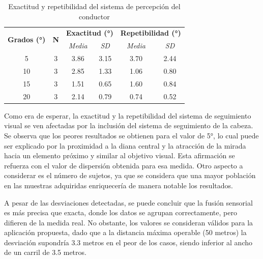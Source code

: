\newpage
\begin{table}[h]
\centering
\begin{tabular}{cccccc}
\multirow{2}{*}{\textbf{Grados (°)}} & \multirow{2}{*}{\textbf{N}} & \multicolumn{2}{c}{\textbf{Exactitud (°)}} & \multicolumn{2}{c}{\textbf{Repetibilidad (°)}} \\ \cline{3-6} 
                                     &                             & \textit{Media}        & \textit{SD}        & \textit{Media}          & \textit{SD}          \\ \hline
5                                    & 3                           & 3.86                  & 3.15               & 3.70                    & 2.44                 \\ \hline
10                                   & 3                           & 2.85                  & 1.33               & 1.06                    & 0.80                 \\ \hline
15                                   & 3                           & 1.51                  & 0.65               & 1.60                    & 0.84                 \\ \hline
20                                   & 3                           & 2.14                  & 0.79               & 0.74                    & 0.52                 \\ \hline
\end{tabular}
\caption{Exactitud y repetibilidad del sistema de percepción del conductor}
\label{tab:4.1}
\end{table}

\vspace{-15pt}
Como era de esperar, la exactitud y la repetibilidad del sistema de seguimiento visual se ven afectadas por la inclusión del sistema de seguimiento de la cabeza. Se observa que los peores resultados se obtienen para el valor de 5°, lo cual puede ser explicado por la proximidad a la diana central y la atracción de la mirada hacia un elemento próximo y similar al objetivo visual. Esta afirmación se refuerza con el valor de dispersión obtenida para esa medida. Otro aspecto a considerar es el número de sujetos, ya que se considera que una mayor población en las muestras adquiridas enriquecería de manera notable los resultados. 

A pesar de las desviaciones detectadas, se puede concluir que la fusión sensorial es más precisa que exacta, donde los datos se agrupan correctamente, pero difieren de la medida real. No obstante, los valores se consideran válidos para la aplicación propuesta, dado que a la distancia máxima operable (50 metros) la desviación supondría 3.3 metros en el peor de los casos, siendo inferior al ancho de un carril de 3.5 metros. 

